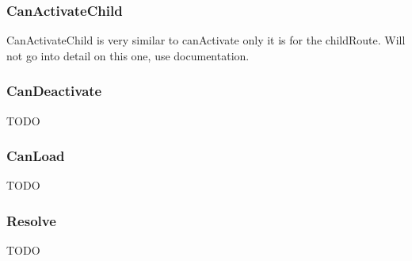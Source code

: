 \subsubsection{ CanActivateChild }
CanActivateChild is very similar to canActivate only it is for the childRoute.
Will not go into detail on this one, use documentation.

\subsubsection{ CanDeactivate }
TODO

\subsubsection{ CanLoad }
TODO

\subsubsection{ Resolve }
TODO
